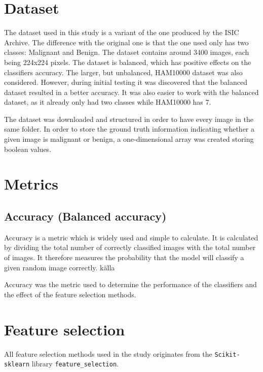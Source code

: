 \documentclass{kththesis}
\begin{document}
\section{Dataset}

The dataset used in this study is a variant of the one produced by the ISIC Archive. The difference with the original one is that the one used only has two classes: Malignant and Benign. The dataset contains around 3400 images, each being 224x224 pixels. The dataset is balanced, which has positive effects on the classifiers accuracy. The larger, but unbalanced, HAM10000 dataset was also considered. However, during initial testing it was discovered that the balanced dataset resulted in a better accuracy. It was also easier to work with the balanced dataset, as it already only had two classes while HAM10000 has 7.

The dataset was downloaded and structured in order to have every image in the same folder. In order to store the ground truth information indicating whether a given image is malignant or benign, a one-dimensional array was created storing boolean values.

\section{Metrics}

\subsection{Accuracy (Balanced accuracy)}

Accuracy is a metric which is widely used and simple to calculate.  
It is calculated by dividing the total number of correctly classified images with the total number of images. 
It therefore measures the probability that the model will classify a given random image correctly. källa  

Accuracy was the metric used to determine the performance of the classifiers and the effect of the feature selection methods.



\section{Feature selection}

All feature selection methods used in the study originates from the \verb|Scikit-sklearn| library \verb|feature_selection|.
\end{document}
